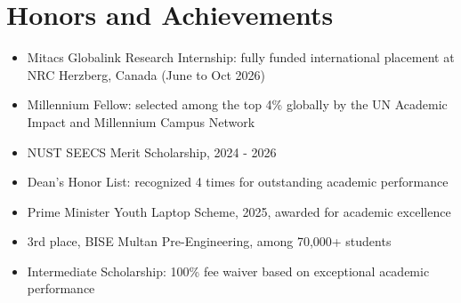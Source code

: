 \documentclass[letterpaper,11pt]{article}
\begin{document}
\section{Honors and Achievements}
 \begin{itemize}[leftmargin=0.15in, label={}]
    \small{\item{
     \begin{itemize}[leftmargin=0.15in]
       \item Mitacs Globalink Research Internship: fully funded international placement at NRC Herzberg, Canada (June to Oct 2026)
       \item Millennium Fellow: selected among the top 4\% globally by the UN Academic Impact and Millennium Campus Network
       \item NUST SEECS Merit Scholarship, 2024 - 2026
       \item Dean's Honor List: recognized 4 times for outstanding academic performance
       \item Prime Minister Youth Laptop Scheme, 2025, awarded for academic excellence
       \item 3rd place, BISE Multan Pre-Engineering, among 70,000+ students
       \item Intermediate Scholarship: 100\% fee waiver based on exceptional academic performance
     \end{itemize}
    }}
 \end{itemize}
\end{document}
